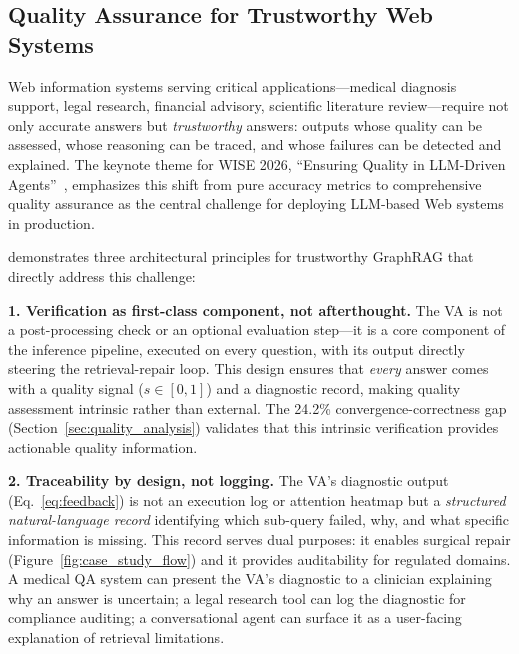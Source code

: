 
\subsection{Quality Assurance for Trustworthy Web Systems}

Web information systems serving critical applications---medical diagnosis support,
legal research, financial advisory, scientific literature review---require not
only accurate answers but \emph{trustworthy} answers: outputs whose quality can
be assessed, whose reasoning can be traced, and whose failures can be detected
and explained. The keynote theme for WISE 2026, ``Ensuring Quality in LLM-Driven
Agents''~\cite{benatallah2026keynote}, emphasizes this shift from pure accuracy
metrics to comprehensive quality assurance as the central challenge for deploying
LLM-based Web systems in production.

\sys demonstrates three architectural principles for trustworthy GraphRAG that
directly address this challenge:

\smallskip
\noindent\textbf{1. Verification as first-class component, not afterthought.}
The VA is not a post-processing check or an optional evaluation step---it is a
core component of the inference pipeline, executed on every question, with its
output directly steering the retrieval-repair loop. This design ensures that
\emph{every} answer comes with a quality signal ($s \in [0,1]$) and a diagnostic
record, making quality assessment intrinsic rather than external. The 24.2\%
convergence-correctness gap (Section~\ref{sec:quality_analysis}) validates that
this intrinsic verification provides actionable quality information.

\smallskip
\noindent\textbf{2. Traceability by design, not logging.}
The VA's diagnostic output (Eq.~\ref{eq:feedback}) is not an execution log or
attention heatmap but a \emph{structured natural-language record} identifying
which sub-query failed, why, and what specific information is missing. This
record serves dual purposes: it enables surgical repair (Figure~\ref{fig:case_study_flow})
and it provides auditability for regulated domains. A medical QA system can
present the VA's diagnostic to a clinician explaining why an answer is uncertain;
a legal research tool can log the diagnostic for compliance auditing; a
conversational agent can surface it as a user-facing explanation of retrieval
limitations.

